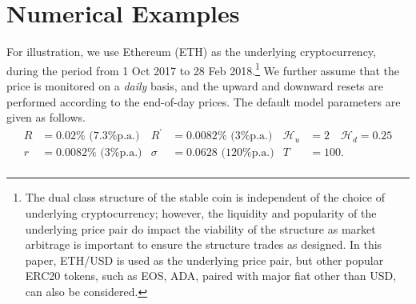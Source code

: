 \documentclass[draft, noinfoline]{ectaart}
\numberwithin{equation}{section}
\theoremstyle{plain}
\begin{document}
\section{Numerical Examples}\label{sect:numerical}

For illustration, we use Ethereum (ETH) as the underlying cryptocurrency, during the period from 1 Oct 2017 to 28 Feb 2018.\footnote{The dual class structure of the stable coin is independent of the choice of underlying cryptocurrency; however, the liquidity and popularity of the underlying price pair do impact the viability of the structure as market arbitrage is important to ensure the structure trades as designed. In this paper, ETH/USD is used as the underlying price pair, but other popular ERC20 tokens, such as EOS, ADA, paired with major fiat other than USD, can also be considered.} We further assume that the price is monitored on a \emph{daily} basis, and the upward and downward resets are performed according to the end-of-day prices.
 The default model parameters are given as follows.
\begin{align*}
R& =0.02\% \text{ (7.3\% p.a.)} & R^\prime & = 0.0082\% \text{ (3\% p.a.)} &\mathcal{H}_{u} & =2 \quad \mathcal{H}_{d}  =0.25\\
r&=0.0082\% \text{ (3\% p.a.)}  & \sigma &= 0.0628 \text{ (120\% p.a.)}  & T &= 100. \\
\end{align*}


\end{document}
